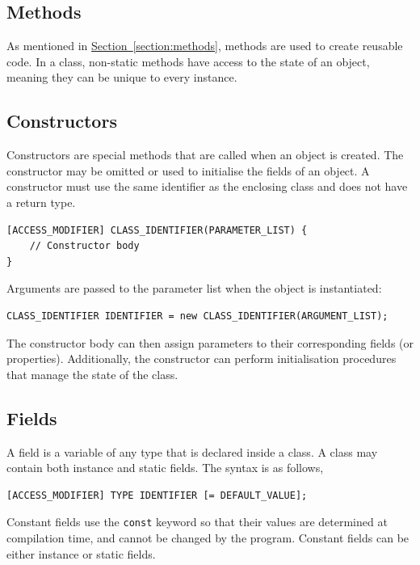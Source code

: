 \documentclass{article}
\begin{document}
\subsection{Methods}
As mentioned in \hyperref[section:methods]{Section~\ref{section:methods}}, methods are used to
create reusable code. In a class, non-static methods have access to the
state of an object, meaning they can be unique to every instance.
\subsection{Constructors}
Constructors are special methods that are called when an object is created.
The constructor may be omitted or used to initialise the fields of an object.
A constructor must use the same identifier as the enclosing class and does not have a return type.
\begin{lstlisting}[numbers=none]
[ACCESS_MODIFIER] CLASS_IDENTIFIER(PARAMETER_LIST) {
    // Constructor body
}
\end{lstlisting}
Arguments are passed to the parameter list when the object is instantiated:
\begin{lstlisting}[numbers=none]
CLASS_IDENTIFIER IDENTIFIER = new CLASS_IDENTIFIER(ARGUMENT_LIST); 
\end{lstlisting}
The constructor body can then assign parameters to their corresponding fields (or properties).
Additionally, the constructor can perform initialisation procedures that manage the state of the class.
\subsection{Fields}
A field is a variable of any type that is declared inside a class. A class may contain both instance
and static fields. The syntax is as follows,
\begin{lstlisting}[numbers=none]
[ACCESS_MODIFIER] TYPE IDENTIFIER [= DEFAULT_VALUE];
\end{lstlisting}
Constant fields use the \lstinline{const} keyword so that their values are determined at compilation time, and cannot be changed
by the program. Constant fields can be either instance or static fields.
\end{document}
